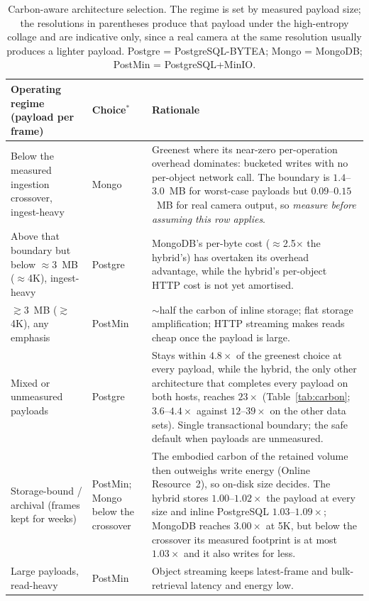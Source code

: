 \documentclass[pdflatex,sn-basic]{sn-jnl}%
\begin{document}
\begin{table}[htbp]
\color{markup}
\caption{Carbon-aware architecture selection. The regime is set by measured payload size; the resolutions in parentheses produce that payload under the high-entropy collage and are indicative only, since a real camera at the same resolution usually produces a lighter payload. Postgre = PostgreSQL-BYTEA; Mongo = MongoDB; PostMin = PostgreSQL+MinIO.}\label{tab:decision}
\footnotesize
\begin{tabular}{@{}p{}p{}p{}@{}}
\toprule
Operating regime (payload per frame) & Choice$^{\ast}$ & Rationale \\
\midrule
Below the measured ingestion crossover, ingest-heavy & Mongo & Greenest where its near-zero per-operation overhead dominates: bucketed writes with no per-object network call. The boundary is $1.4$--$3.0$~MB for worst-case payloads but $0.09$--$0.15$~MB for real camera output, so \emph{measure before assuming this row applies}. \\
Above that boundary but below $\approx$3~MB ($\approx$4K), ingest-heavy & Postgre & MongoDB's per-byte cost ($\approx$2.5$\times$ the hybrid's) has overtaken its overhead advantage, while the hybrid's per-object HTTP cost is not yet amortised. \\
$\gtrsim$3~MB ($\gtrsim$4K), any emphasis & PostMin & $\sim$half the carbon of inline storage; flat storage amplification; HTTP streaming makes reads cheap once the payload is large. \\
Mixed or unmeasured payloads & Postgre & Stays within $4.8\times$ of the greenest choice at every payload, while the hybrid, the only other architecture that completes every payload on both hosts, reaches $23\times$ (Table~\ref{tab:carbon}; $3.6$--$4.4\times$ against $12$--$39\times$ on the other data sets). Single transactional boundary; the safe default when payloads are unmeasured. \\
Storage-bound / archival (frames kept for weeks) & PostMin; Mongo below the crossover & The embodied carbon of the retained volume then outweighs write energy (Online Resource~2), so on-disk size decides. The hybrid stores $1.00$--$1.02\times$ the payload at every size and inline PostgreSQL $1.03$--$1.09\times$; MongoDB reaches $3.00\times$ at 5K, but below the crossover its measured footprint is at most $1.03\times$ and it also writes for less. \\
Large payloads, read-heavy & PostMin & Object streaming keeps latest-frame and bulk-retrieval latency and energy low. \\

\end{tabular}
\end{table}
\end{document}
